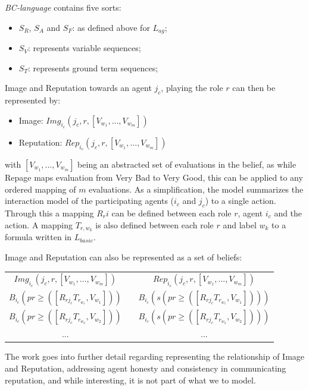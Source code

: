 \textit{\textit{BC}-language} contains five sorts:
\begin{itemize}
    \item $S_R$, $S_A$ and $S_F$: as defined above for $L_{ag}$;
    \item $S_V$: represents variable sequences;
    \item $S_T$: represents ground term sequences;
\end{itemize}

Image and Reputation towards an agent $j_c$, playing the role $r$ can then be represented by:
\begin{itemize}
    \item Image: $Img_{i_c} (j_c, r, [V_{w_1}, ..., V_{w_m}])$
    \item Reputation: $Rep_{i_c} (j_c, r, [V_{w_1}, ..., V_{w_m}])$
\end{itemize}
with $[V_{w_1}, ..., V_{w_m}]$ being an abstracted set of evaluations in the belief, as while Repage maps evaluation from Very Bad to Very Good, this can be applied to any ordered mapping of $m$ evaluations. As a simplification, the model summarizes the interaction model of the participating agents ($i_c$ and $j_c$) to a single action. Through this a mapping $R_ri$ can be defined between each role $r$, agent $i_c$ and the action. A mapping $T_{r, w_k}$ is also defined between each role $r$ and label $w_k$ to a formula written in $L_{basic}$.

Image and Reputation can also be represented as a set of beliefs:
\begin{table}[]
    \centering
    \begin{tabular}{ccc}
        $Img_{i_c}(j_c, r, [V_{w_1}, ..., V_{w_m}])$  & & $Rep_{i_c} (j_c, r, [V_{w_1}, ..., V_{w_m}])$\\ \cline{1-1} \cline{3-3} 
        $B_{i_c} (pr\geq([R_{rj_c} T_{r_{w_1}}, V_{w_1}]))$ & & $B_{i_c} (s(pr\geq([R_{rj_c} T_{r_{w_1}}, V_{w_1}])))$ \\
        $B_{i_c} (pr\geq([R_{rj_c} T_{r_{w_2}}, V_{w_2}]))$ & & $B_{i_c} (s(pr\geq([R_{rj_c} T_{r_{w_2}}, V_{w_2}])))$ \\
        ... & & ...
    \end{tabular}
\end{table}

The work goes into further detail regarding representing the relationship of Image and Reputation, addressing agent honesty and consistency in communicating reputation, and while interesting, it is not part of what we to model.

